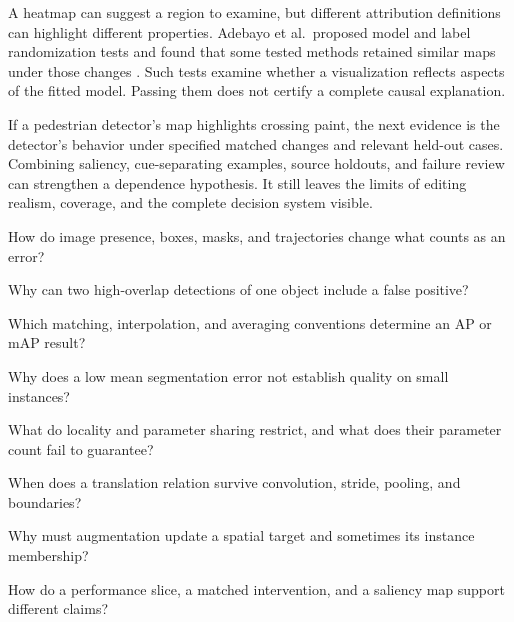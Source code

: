 A heatmap can suggest a region to examine, but different attribution definitions can highlight different properties. Adebayo et al.\ proposed model and label randomization tests and found that some tested methods retained similar maps under those changes \citep{adebayo2018sanity}. Such tests examine whether a visualization reflects aspects of the fitted model. Passing them does not certify a complete causal explanation.

If a pedestrian detector's map highlights crossing paint, the next evidence is the detector's behavior under specified matched changes and relevant held-out cases. Combining saliency, cue-separating examples, source holdouts, and failure review can strengthen a dependence hypothesis. It still leaves the limits of editing realism, coverage, and the complete decision system visible.

\begin{studyquestions}
\item How do image presence, boxes, masks, and trajectories change what counts as an error?
\item Why can two high-overlap detections of one object include a false positive?
\item Which matching, interpolation, and averaging conventions determine an AP or mAP result?
\item Why does a low mean segmentation error not establish quality on small instances?
\item What do locality and parameter sharing restrict, and what does their parameter count fail to guarantee?
\item When does a translation relation survive convolution, stride, pooling, and boundaries?
\item Why must augmentation update a spatial target and sometimes its instance membership?
\item How do a performance slice, a matched intervention, and a saliency map support different claims?
\end{studyquestions}

